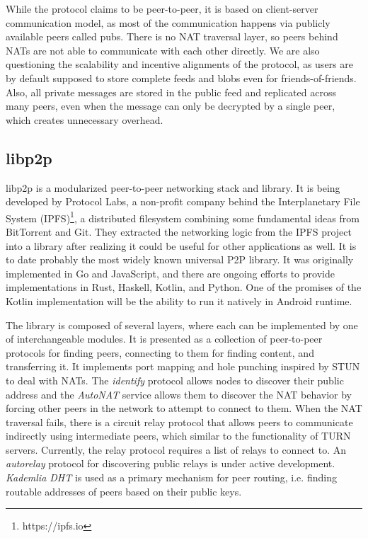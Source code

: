 
While the protocol claims to be peer-to-peer, it is based on client-server communication model, as most of the communication happens via publicly available peers called pubs. There is no NAT traversal layer, so peers behind NATs are not able to communicate with each other directly. We are also questioning the scalability and incentive alignments of the protocol, as users are by default supposed to store complete feeds and blobs even for friends-of-friends. Also, all private messages are stored in the public feed and replicated across many peers, even when the message can only be decrypted by a single peer, which creates unnecessary overhead.

\subsection{libp2p}


libp2p \cite{libp2p} is a modularized peer-to-peer networking stack and library. It is being developed by Protocol Labs, a non-profit company behind the Interplanetary File System (IPFS)\footnote{https://ipfs.io}, a distributed filesystem combining some fundamental ideas from BitTorrent and Git. They extracted the networking logic from the IPFS project into a library after realizing it could be useful for other applications as well. It is to date probably the most widely known universal P2P library. It was originally implemented in Go and JavaScript, and there are ongoing efforts to provide implementations in Rust, Haskell, Kotlin, and Python. One of the promises of the Kotlin implementation will be the ability to run it natively in Android runtime.

The library is composed of several layers, where each can be implemented by one of interchangeable modules. It is presented as a collection of peer-to-peer protocols for finding peers, connecting to them for finding content, and transferring it. It implements port mapping and hole punching inspired by STUN to deal with NATs. The \textit{identify} protocol allows nodes to discover their public address and the \textit{AutoNAT} service allows them to discover the NAT behavior by forcing other peers in the network to attempt to connect to them. When the NAT traversal fails, there is a circuit relay protocol that allows peers to communicate indirectly using intermediate peers, which similar to the functionality of TURN servers. Currently, the relay protocol requires a list of relays to connect to. An \textit{autorelay} protocol for discovering public relays is under active development. \textit{Kademlia DHT} is used as a primary mechanism for peer routing, i.e. finding routable addresses of peers based on their public keys.

